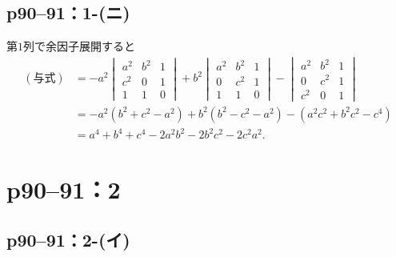


\subsection*{p90--91：1-(ニ)}

\begin{tanswer}
  第$1$列で余因子展開すると
  \begin{align*}
    (\text{与式}) & = -a^2\begin{vmatrix} a^2 & b^2 & 1 \\ c^2 & 0 & 1 \\ 1 & 1 & 0 \end{vmatrix}+b^2 \begin{vmatrix} a^2 & b^2 & 1 \\ 0 & c^2 & 1 \\ 1 & 1 & 0 \end{vmatrix} - \begin{vmatrix} a^2 & b^2 & 1 \\ 0 & c^2 & 1 \\ c^2 & 0 & 1 \end{vmatrix} \\
                & = -a^2 (b^2+c^2 -a^2) +b^2 (b^2-c^2-a^2)- (a^2c^2+b^2c^2-c^4)                                                                                                                                                                         \\
                & =a^4+b^4+c^4 -2a^2b^2 - 2b^2 c^2 -2c^2 a^2 .
  \end{align*}
\end{tanswer}



\section*{p90--91：2}

\subsection*{p90--91：2-(イ)}

